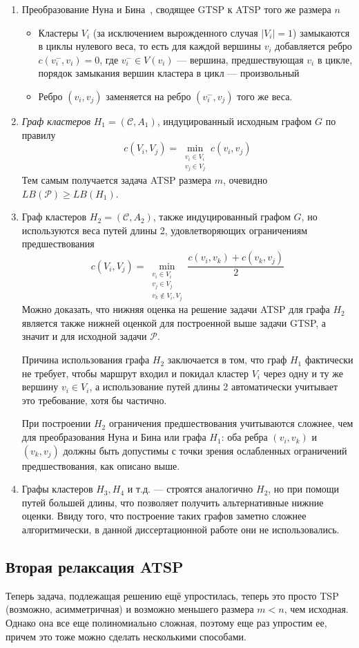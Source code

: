 \begin{enumerate}
  \item Преобразование Нуна и Бина~\cite{NoonBean1993},
    сводящее GTSP к ATSP того же размера $n$
  \begin{itemize}
    \item
    Кластеры $V_i$
    (за исключением вырожденного случая $|V_i|=1$)
    замыкаются в циклы нулевого веса,
    то есть для каждой вершины $v_i$ добавляется ребро
    $c(v_i^-,v_i)=0$,
    где $v_i^- \in V(v_i)$ --- вершина, предшествующая $v_i$ в цикле,
    порядок замыкания вершин кластера в цикл --- произвольный
    \item
    Ребро $(v_i, v_j)$
    заменяется на ребро $(v_i^-,v_j)$
    того же веса.
  \end{itemize}
  \item
  \textit{Граф кластеров}
  $H_1 = (\mathcal C, A_1)$,
  индуцированный исходным графом $G$
  по правилу
  $$
    c(V_i, V_j)=\min_{\substack{v_i\in V_i \\ v_j \in V_j}}
    c(v_i,v_j)
  $$
  Тем самым получается задача ATSP размера $m$,
  очевидно
  $LB(\mathcal P) \geqslant LB(H_1)$.
  \item
  Граф кластеров
  $H_2 = (\mathcal C, A_2)$,
  также индуцированный графом $G$,
  но используются веса путей длины 2,
  удовлетворяющих ограничениям предшествования
  $$
    c(V_i, V_j)=\min_{\substack{v_i\in V_i \\ v_j \in V_j \\ v_k\notin V_i, V_j}}
    \frac{c(v_i,v_k)+c(v_k,v_j)}{2}
  $$
  Можно доказать,
  что нижняя оценка на решение задачи ATSP
  для графа $H_2$
  является также нижней оценкой для
  построенной выше задачи GTSP,
  а значит и для исходной задачи
  $\mathcal P$.

  Причина использования графа $H_2$
  заключается в том, что
  граф $H_1$
  фактически не требует,
  чтобы маршрут входил и покидал кластер $V_i$
  через одну и ту же вершину $v_i \in V_i$,
  а использование путей длины 2
  автоматически учитывает это требование,
  хотя бы частично.

  При построении $H_2$
  ограничения предшествования учитываются сложнее,
  чем для преобразования Нуна и Бина или графа $H_1$:
  оба ребра
  $(v_i, v_k)$ и $(v_k, v_j)$
  должны быть допустимы с точки зрения ослабленных
  ограничений предшествования,
  как описано выше.
  \item
  Графы кластеров $H_3, H_4$ и т.д. ---
  строятся аналогично $H_2$,
  но при помощи путей большей длины,
  что позволяет получить альтернативные нижние оценки.
  Ввиду того,
  что построение таких графов заметно сложнее алгоритмически,
  в данной диссертационной работе они не использовались.
\end{enumerate}

\subsection*{Вторая релаксация ATSP }
Теперь задача,
подлежащая решению ещё упростилась,
теперь это просто TSP
(возможно, асимметричная)
и возможно меньшего размера $m<n$,
чем исходная.
Однако она все еще полиномиально сложная,
поэтому еще раз упростим ее,
причем это тоже можно сделать несколькими способами.

